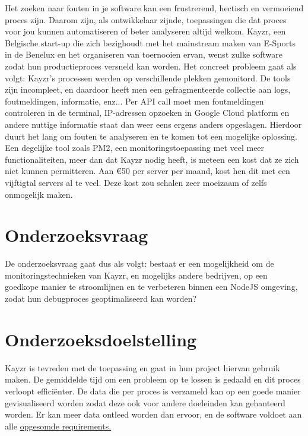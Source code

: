 Het zoeken naar fouten in je software kan een frustrerend, hectisch en vermoeiend proces zijn. Daarom zijn, als ontwikkelaar zijnde, toepassingen die dat proces voor jou kunnen automatiseren of beter analyseren altijd welkom. Kayzr, een Belgische start-up die zich bezighoudt met het mainstream maken van E-Sports in de Benelux en het organiseren van toernooien ervan, wenst zulke software zodat hun productieproces versneld kan worden. Het concreet probleem gaat als volgt: Kayzr's processen werden op verschillende plekken gemonitord. De tools zijn incompleet, en daardoor heeft men een gefragmenteerde collectie aan logs, foutmeldingen, informatie, enz...  Per API call moet men foutmeldingen controleren in de terminal, IP-adressen opzoeken in Google Cloud platform en andere nuttige informatie staat dan weer eens ergens anders opgeslagen. Hierdoor duurt het lang om fouten te analyseren en te komen tot een mogelijke oplossing. Een degelijke tool zoals PM2, een monitoringstoepassing met veel meer functionaliteiten, meer dan dat Kayzr nodig heeft, is meteen een kost dat ze zich niet kunnen permitteren. Aan \euro 50 per server per maand, kost hen dit met een vijftigtal servers al te veel. Deze kost zou schalen zeer moeizaam of zelfs onmogelijk maken.

\section{Onderzoeksvraag}
\label{sec:onderzoeksvraag}

De onderzoeksvraag gaat dus als volgt: bestaat er een mogelijkheid om de monitoringstechnieken van Kayzr, en mogelijks andere bedrijven, op een goedkope manier te stroomlijnen en te verbeteren binnen een NodeJS omgeving, zodat hun debugproces geoptimaliseerd kan worden? 


\section{Onderzoeksdoelstelling}
\label{sec:onderzoeksdoelstelling}

Kayzr is tevreden met de toepassing en gaat in hun project hiervan gebruik maken. De gemiddelde tijd om een probleem op te lossen is gedaald en dit proces verloopt efficiënter. De data die per proces is verzameld kan op een goede manier gevisualiseerd worden zodat deze ook voor andere doeleinden kan gehanteerd worden. Er kan meer data ontleed worden dan ervoor, en de software voldoet aan alle \hyperref[sec:requirements]{opgesomde requirements. }


